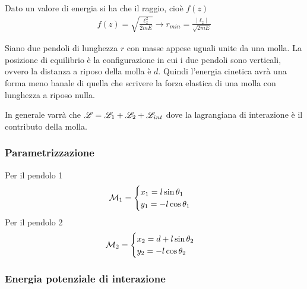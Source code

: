 \documentclass[Main.tex]{subfiles}
\begin{document}
\begin{tema}
Dato un valore di energia si ha che il raggio, cioè $f(z)$
\begin{gather}
	f(z) = \sqrt{\frac{\ell_z^2}{2mE}} \rightarrow r_{min} = \frac{|\ell_z|}{\sqrt{2mE}}
\end{gather}
\end{tema}


\begin{tema}
	Siano due pendoli di lunghezza $r$ con masse appese uguali unite da una molla.
	La posizione di equilibrio è la configurazione in cui i due pendoli sono verticali, ovvero la distanza a riposo della molla è $d$. Quindi l'energia cinetica avrà una forma meno banale di quella che scrivere la forza elastica di una molla con lunghezza a riposo nulla.
	
	In generale varrà che $\mathscr{L} = \mathscr{L}_1 +\mathscr{L}_2 + \mathscr{L}_{int}$ dove la lagrangiana di interazione è il contributo della molla. 
	\subsubsection*{Parametrizzazione}
	Per il pendolo 1
	\begin{gather}
		\mathcal{M}_1 = \begin{cases}
			x_1= l \sin \theta_1 \\
			y_1 = - l \cos\theta_1
		\end{cases}
	\end{gather}
	Per il pendolo 2
	\begin{gather}
		\mathcal{M}_2 = \begin{cases}
			x_2= d+l \sin \theta_2 \\
			y_2 = - l \cos\theta_2
		\end{cases}
	\end{gather}
	
	\subsubsection*{Energia potenziale di interazione}
	

\end{tema}
\end{document}
